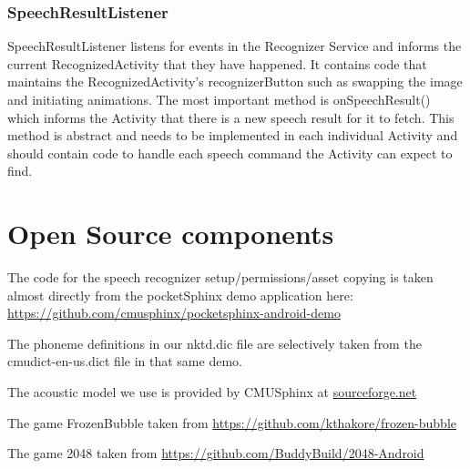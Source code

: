 \documentclass[11pt, oneside]{article}
\begin{document}
\subsubsection{SpeechResultListener}
SpeechResultListener listens for events in the Recognizer Service and
informs the current RecognizedActivity that they have happened. It
contains code that maintains the RecognizedActivity's recognizerButton
such as swapping the image and initiating animations. The most
important method is onSpeechResult() which informs the Activity that
there is a new speech result for it to fetch. This method is abstract
and needs to be implemented in each individual Activity and should
contain code to handle each speech command the Activity can expect to
find.

\section{Open Source components}

The code for the speech recognizer setup/permissions/asset copying is
taken almost directly from the pocketSphinx demo application here:
\url{https://github.com/cmusphinx/pocketsphinx-android-demo}

The phoneme definitions in our nktd.dic file are selectively taken
from the cmudict-en-us.dict file in that same demo.

The acoustic model we use is provided by CMUSphinx at
\href{https://sourceforge.net/projects/cmusphinx/files/Acoustic\%20and\%20Language\%20Models/US\%20English/}{sourceforge.net}

The game FrozenBubble taken from
\url{https://github.com/kthakore/frozen-bubble}

The game 2048 taken from
\url{https://github.com/BuddyBuild/2048-Android}
    
\end{document}
